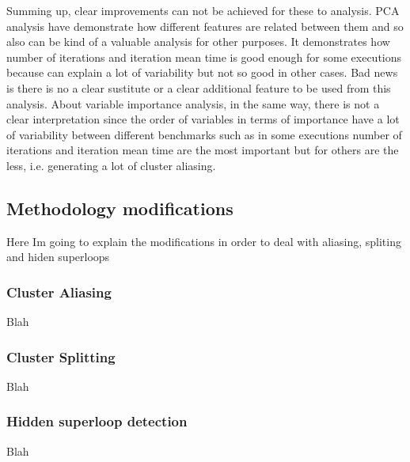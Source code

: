 % 

Summing up, clear improvements can not be achieved for these to analysis. PCA
analysis have demonstrate how different features are related between them and so
also can be kind of a valuable analysis for other purposes. It demonstrates how
number of iterations and iteration mean time is good enough for some executions
because can explain a lot of variability but not so good in other cases. Bad
news is there is no a clear sustitute or a clear additional feature to be used
from this analysis. About variable importance analysis, in the same way, there
is not a clear interpretation since the order of variables in terms of
importance have a lot of variability between different benchmarks such as in
some executions number of iterations and iteration mean time are the most
important but for others are the less, i.e. generating a lot of cluster
aliasing. 

\subsection{Methodology modifications}\label{ss:methodology_modifications}

Here Im going to explain the modifications in order to deal with aliasing,
spliting and hiden superloops

\subsubsection{Cluster Aliasing}

Blah 

\subsubsection{Cluster Splitting}

Blah

\subsubsection{Hidden superloop detection}

Blah
